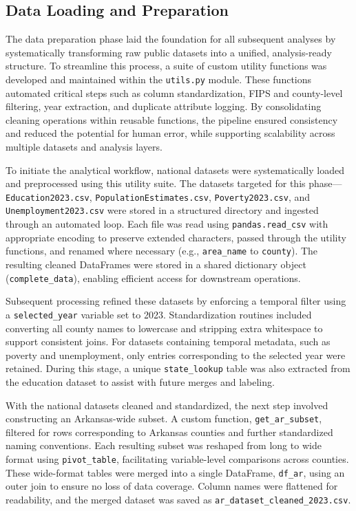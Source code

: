 \documentclass{llncs}
\begin{document}
\subsection{Data Loading and Preparation}

The data preparation phase laid the foundation for all subsequent analyses by systematically transforming raw public datasets into a unified, analysis-ready structure. To streamline this process, a suite of custom utility functions was developed and maintained within the \texttt{utils.py} module. These functions automated critical steps such as column standardization, FIPS and county-level filtering, year extraction, and duplicate attribute logging. By consolidating cleaning operations within reusable functions, the pipeline ensured consistency and reduced the potential for human error, while supporting scalability across multiple datasets and analysis layers.

To initiate the analytical workflow, national datasets were systematically loaded and preprocessed using this utility suite. The datasets targeted for this phase---\texttt{Education2023.csv}, \texttt{PopulationEstimates.csv}, \texttt{Poverty2023.csv}, and \texttt{Unemployment2023.csv} were stored in a structured directory \texttt{} and ingested through an automated loop. Each file was read using \texttt{pandas.read\_csv} with appropriate encoding to preserve extended characters, passed through the utility functions, and renamed where necessary (e.g., \texttt{area\_name} to \texttt{county}). The resulting cleaned DataFrames were stored in a shared dictionary object (\texttt{complete\_data}), enabling efficient access for downstream operations.

Subsequent processing refined these datasets by enforcing a temporal filter using a \texttt{selected\_year} variable set to 2023. Standardization routines included converting all county names to lowercase and stripping extra whitespace to support consistent joins. For datasets containing temporal metadata, such as poverty and unemployment, only entries corresponding to the selected year were retained. During this stage, a unique \texttt{state\_lookup} table was also extracted from the education dataset to assist with future merges and labeling.

With the national datasets cleaned and standardized, the next step involved constructing an Arkansas-wide subset. A custom function, \texttt{get\_ar\_subset}, filtered for rows corresponding to Arkansas counties and further standardized naming conventions. Each resulting subset was reshaped from long to wide format using \texttt{pivot\_table}, facilitating variable-level comparisons across counties. These wide-format tables were merged into a single DataFrame, \texttt{df\_ar}, using an outer join to ensure no loss of data coverage. Column names were flattened for readability, and the merged dataset was saved as \texttt{ar\_dataset\_cleaned\_2023.csv}.
\end{document}
